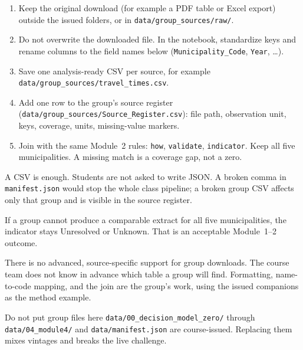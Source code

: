 \documentclass[11pt,a4paper]{article}
\begin{document}
\begin{enumerate}
    \item Keep the original download (for example a PDF table or
    Excel export) outside the issued folders, or in
    \texttt{data/group\_sources/raw/}.
    \item Do not overwrite the downloaded file. In the notebook,
    standardize keys and rename columns to the field names below
    (\texttt{Municipality\_Code}, \texttt{Year}, \ldots).
    \item Save one analysis-ready CSV per source, for example
    \texttt{data/group\_sources/travel\_times.csv}.
    \item Add one row to the group's source register
    (\texttt{data/group\_sources/Source\_Register.csv}):
    file path, observation unit, keys, coverage, units,
    missing-value markers.
    \item Join with the same Module~2 rules:
    \texttt{how}, \texttt{validate}, \texttt{indicator}.
    Keep all five municipalities. A missing match is a coverage
    gap, not a zero.
\end{enumerate}

A CSV is enough. Students are not asked to write JSON.
A broken comma in \texttt{manifest.json} would stop the whole
class pipeline; a broken group CSV affects only that group
and is visible in the source register.

If a group cannot produce a comparable extract for all five
municipalities, the indicator stays Unresolved or Unknown.
That is an acceptable Module~1--2 outcome.

There is no advanced, source-specific support for group
downloads. The course team does not know in advance which
table a group will find. Formatting, name-to-code mapping,
and the join are the group's work, using the issued companions
as the method example.

\begin{databox}{Do not put group files here}
\texttt{data/00\_decision\_model\_zero/} through
\texttt{data/04\_module4/} and \texttt{data/manifest.json}
are course-issued. Replacing them mixes vintages and breaks
the live challenge.
\end{databox}
\end{document}
